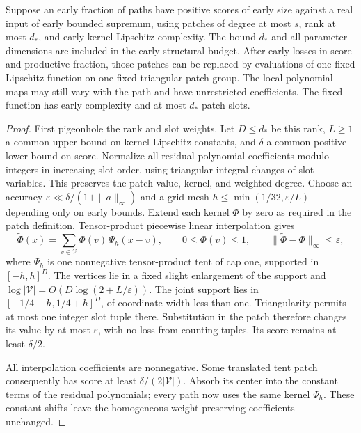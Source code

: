 \begin{lemma}
\label{lifting:fixed-patch-function}
Suppose an early fraction of paths have positive scores of early
size against a real input of early bounded supremum, using patches of degree at most
$s$, rank at most $d_*$, and early kernel Lipschitz complexity.
The bound $d_*$ and all parameter dimensions are included in the
early structural budget.
After early losses in score and productive fraction, those patches
can be replaced by evaluations of one fixed Lipschitz function on
one fixed triangular patch group.  The local polynomial maps may
still vary with the path and have unrestricted coefficients.  The
fixed function has early complexity and at most $d_*$ patch slots.
\end{lemma}

\begin{proof}
First pigeonhole the rank and slot weights.  Let $D\le d_*$ be this
rank, $L\ge1$ a common upper bound on kernel Lipschitz constants, and
$\delta$ a common positive lower bound on score.
Normalize all residual polynomial coefficients modulo integers in
increasing slot order, using triangular integral changes of slot
variables.  This preserves the patch value, kernel, and weighted
degree.  Choose an accuracy
$\varepsilon\ll\delta/(1+\|a\|_\infty)$ and a grid mesh
$h\le\min(1/32,\varepsilon/L)$ depending only on early bounds.
Extend each kernel $\Phi$ by zero as required in the patch definition.
Tensor-product piecewise linear interpolation gives
\[
 \widetilde\Phi(x)=\sum_{v\in\mathcal V}\Phi(v)\,\Psi_h(x-v),
 \qquad 0\le\Phi(v)\le1,
 \qquad \|\widetilde\Phi-\Phi\|_\infty\le\varepsilon,
\]
where $\Psi_h$ is one nonnegative tensor-product tent of cap one,
supported in $[-h,h]^D$.  The vertices lie in a fixed slight
enlargement of the support and
$\log|\mathcal V|=O(D\log(2+L/\varepsilon))$.
The joint support lies in $[-1/4-h,1/4+h]^D$, of coordinate width
less than one.  Triangularity permits at most one integer slot tuple
there.  Substitution in the patch therefore changes its value by at
most $\varepsilon$, with no loss from counting tuples.  Its score
remains at least $\delta/2$.

All interpolation coefficients are nonnegative.  Some translated
tent patch consequently has score at least
$\delta/(2|\mathcal V|)$.  Absorb its center into the constant terms
of the residual polynomials; every path now uses the same kernel
$\Psi_h$.  These constant shifts leave the homogeneous
weight-preserving coefficients unchanged.


\end{proof}
